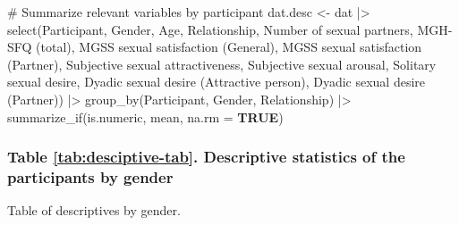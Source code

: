 \documentclass[
  bookmarksnumbered]{article}
\newenvironment{Shaded}{\begin{snugshade}}{\end{snugshade}}
\newcommand{\AttributeTok}[1]{\textcolor[rgb]{0.80,0.80,0.80}{#1}}
\newcommand{\CommentTok}[1]{\textcolor[rgb]{0.50,0.62,0.50}{#1}}
\newcommand{\ConstantTok}[1]{\textcolor[rgb]{0.86,0.64,0.64}{\textbf{#1}}}
\newcommand{\FunctionTok}[1]{\textcolor[rgb]{0.94,0.94,0.56}{#1}}
\newcommand{\NormalTok}[1]{\textcolor[rgb]{0.80,0.80,0.80}{#1}}
\newcommand{\OtherTok}[1]{\textcolor[rgb]{0.94,0.94,0.56}{#1}}
\newcommand{\SpecialCharTok}[1]{\textcolor[rgb]{0.86,0.64,0.64}{#1}}
\newcommand{\StringTok}[1]{\textcolor[rgb]{0.80,0.58,0.58}{#1}}
\begin{document}
\begin{Shaded}
\begin{Highlighting}[]
\CommentTok{\# Summarize relevant variables by participant}
\NormalTok{dat.desc }\OtherTok{\textless{}{-}}\NormalTok{ dat }\SpecialCharTok{|\textgreater{}}
  \FunctionTok{select}\NormalTok{(Participant, Gender, Age, Relationship,}
         \StringTok{\textasciigrave{}}\AttributeTok{Number of sexual partners}\StringTok{\textasciigrave{}}\NormalTok{, }\StringTok{\textasciigrave{}}\AttributeTok{MGH{-}SFQ (total)}\StringTok{\textasciigrave{}}\NormalTok{, }
         \StringTok{\textasciigrave{}}\AttributeTok{MGSS sexual satisfaction (General)}\StringTok{\textasciigrave{}}\NormalTok{, }\StringTok{\textasciigrave{}}\AttributeTok{MGSS sexual satisfaction (Partner)}\StringTok{\textasciigrave{}}\NormalTok{, }
         \StringTok{\textasciigrave{}}\AttributeTok{Subjective sexual attractiveness}\StringTok{\textasciigrave{}}\NormalTok{, }\StringTok{\textasciigrave{}}\AttributeTok{Subjective sexual arousal}\StringTok{\textasciigrave{}}\NormalTok{,}
         \StringTok{\textasciigrave{}}\AttributeTok{Solitary sexual desire}\StringTok{\textasciigrave{}}\NormalTok{, }\StringTok{\textasciigrave{}}\AttributeTok{Dyadic sexual desire (Attractive person)}\StringTok{\textasciigrave{}}\NormalTok{, }
         \StringTok{\textasciigrave{}}\AttributeTok{Dyadic sexual desire (Partner)}\StringTok{\textasciigrave{}}\NormalTok{) }\SpecialCharTok{|\textgreater{}}
  \FunctionTok{group\_by}\NormalTok{(Participant, Gender, Relationship) }\SpecialCharTok{|\textgreater{}}
  \FunctionTok{summarize\_if}\NormalTok{(is.numeric, mean, }\AttributeTok{na.rm =} \ConstantTok{TRUE}\NormalTok{)}
\end{Highlighting}
\end{Shaded}

\hypertarget{table-reftabdesciptive-tab.-descriptive-statistics-of-the-participants-by-gender}{%
\subsubsection{Table \ref{tab:desciptive-tab}. Descriptive statistics of the participants by gender}\label{table-reftabdesciptive-tab.-descriptive-statistics-of-the-participants-by-gender}}

Table of descriptives by gender.
\end{document}
